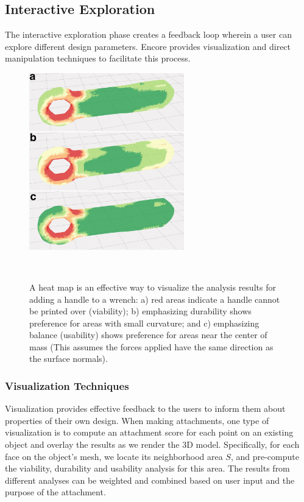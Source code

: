 \subsection{Interactive Exploration}
The interactive exploration phase creates a feedback loop wherein a user can explore different design parameters. Encore provides visualization and direct manipulation techniques to facilitate this process.

\begin{figure}[h]
  \centering
  \includegraphics[width=0.6\textwidth]{figures/encore_visualization.pdf}
  \caption{A heat map is an effective way to visualize the analysis results for adding a handle to a wrench: a) red areas indicate a handle cannot be printed over (viability); b) emphasizing durability shows preference for areas with small curvature; and c) emphasizing balance (usability) shows preference for areas near the center of mass (This assumes the forces applied have the same direction as the surface normals).}~\label{fig:encore_visualization}
\end{figure}

\subsubsection{Visualization Techniques}
Visualization provides effective feedback to the users to inform them about properties of their own design. When making attachments, one type of visualization is to compute an attachment score for each point on an existing object and overlay the results as we render the 3D model. Specifically, for each face on the object's mesh, we locate its neighborhood area $S$, and pre-compute the viability, durability and usability analysis for this area. The results from different analyses can be weighted and combined based on user input and the purpose of the attachment.

